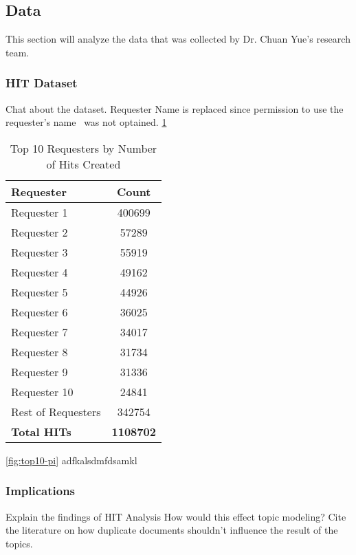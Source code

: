 \documentclass[letterpaper,12pt]{article}
\begin{document}
\subsection{Data}
This section will analyze the data that was collected by Dr. Chuan Yue's research team.

\subsubsection{HIT Dataset}
Chat about the dataset. Requester Name is replaced since permission to use the requester's name \
was not optained.
\ref{tab:requester_top_10}
\begin{table}
	\caption{\label{tab:requester_top_10} Top 10 Requesters by Number of Hits Created}
	\begin{center}
		\begin{tabular}{|l|c|}
			\hline
			\textbf{Requester} & \textbf{Count} \\
			\hline
			Requester 1 & 400699 \\
			\hline
			Requester 2 & 57289 \\
			\hline
			Requester 3 & 55919 \\
			\hline
			Requester 4 & 49162 \\
			\hline
			Requester 5 & 44926 \\
			\hline
			Requester 6 & 36025 \\
			\hline
			Requester 7 & 34017 \\
			\hline
			Requester 8 & 31734 \\
			\hline
			Requester 9 & 31336 \\
			\hline
			Requester 10 & 24841 \\
			\hline
			Rest of Requesters & 342754 \\
			\hline
			\textbf{Total HITs} & \textbf{1108702} \\
			\hline
		\end{tabular}
	\end{center}
\end{table}

\ref{fig:top10-pi}
adfkalsdmfdsamkl

\subsubsection{Implications}
Explain the findings of HIT Analysis
How would this effect topic modeling?
Cite the literature on how duplicate documents shouldn't influence the result of the topics.
\end{document}
